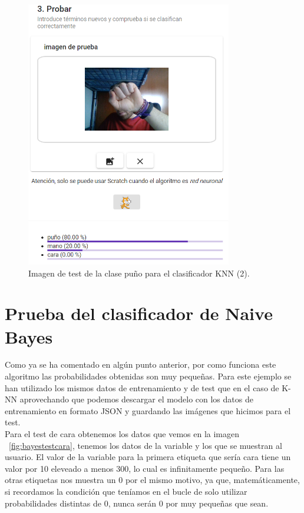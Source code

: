 \documentclass[a4paper, 12pt]{book}
\begin{document}
\begin{figure}
	\centering
	\includegraphics[width=9cm, keepaspectratio]{img/testpunoknnmal}
	\caption{Imagen de test de la clase puño para el clasificador KNN (2).}			
	\label{fig:testpunoknnmal}
\end{figure}



\section{Prueba del clasificador de Naive Bayes} 
\label{sec:pruebabayes}

Como ya se ha comentado en algún punto anterior, por como funciona este algoritmo las probabilidades obtenidas son muy pequeñas. Para este ejemplo se han utilizado los mismos datos de entrenamiento y de test que en el caso de K-NN aprovechando que podemos descargar el modelo con los datos de entrenamiento en formato JSON y guardando las imágenes que hicimos para el test.\\
Para el test de cara obtenemos los datos que vemos en la imagen ~\ref{fig:bayestestcara}, tenemos los datos de la variable y los que se muestran al usuario. El valor de la variable para la primera etiqueta que sería cara tiene un valor por 10 eleveado a menos 300, lo cual es infinitamente pequeño. Para las otras etiquetas nos muestra un 0 por el mismo motivo, ya que, matemáticamente, si recordamos la condición que teníamos en el bucle de solo utilizar probabilidades distintas de 0, nunca serán 0 por muy pequeñas que sean.
\end{document}
